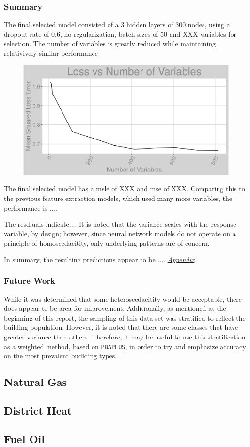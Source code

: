 \subsubsection{Summary}
The final selected model consisted of a 3 hidden layers of 300 nodes, using a dropout rate of 0.6, no regularization, batch sizes of 50 and XXX variables for selection.  The number of variables is greatly reduced while maintaining relativively similar performance

\begin{figure}[h]
\centering
\includegraphics[width=\textwidth, height=0.4\textheight]{Images/electricity_nn_error.png}
\end{figure}

The final selected model has a msle of XXX and mse of XXX.  Comparing this to the previous feature extraction models, which used many more variables, the performance is ....

The resdiuals indicate.... It is noted that the variance scales with the response variable, by design; however, since neural network models do not operate on a principle of homoscedacitity, only underlying patterns are of concern.  

In summary, the resulting predictions appear to be ....  \textit{\hyperref[appendix:electricity:nn_full]{Appendix}}

\subsubsection{Future Work}
While it was determined that some heteroscedacitity would be acceptable, there does appear to be area for improvement.  Additionally, as mentioned at the beginning of this report, the sampling of this data set was stratified to reflect the building population.  However, it is noted that there are some classes that have greater variance than others.  Therefore, it may be useful to use this stratification as a weighted method, based on \lstinline{PBAPLUS}, in order to try and emphasize accuracy on the most prevalent budiding types. 

\FloatBarrier
\newpage
\subsection{Natural Gas}

\FloatBarrier
\newpage
\subsection{District Heat}

\FloatBarrier
\newpage
\subsection{Fuel Oil}